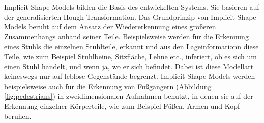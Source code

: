 Implicit Shape Models bilden die Basis des entwickelten Systems.
Sie basieren auf der generalisierten Hough-Transformation.
Das Grundprinzip von Implicit Shape Models beruht auf dem Ansatz der Wiedererkennung eines größeren Zusammenhangs anhand seiner Teile.
Beispielsweise werden für die Erkennung eines Stuhls die einzelnen Stuhlteile, erkannt und aus den Lageinformationn diese Teile, wie zum Beispiel Stuhlbeine, Sitzfläche, Lehne etc., inferiert, ob es sich um einen Stuhl handelt, und wenn ja, wo er sich befindet.
Dabei ist diese Modellart keineswegs nur auf leblose Gegenstände begrenzt.
Implicit Shape Models werden beispielsweise auch für die Erkennung von Fußgängern (Abbildung \vref{fig:pedestrians}) in zweidimensionalen Aufnahmen benutzt, in denen sie auf der Erkennung einzelner Körperteile, wie zum Beispiel Füßen, Armen und Kopf beruhen.

